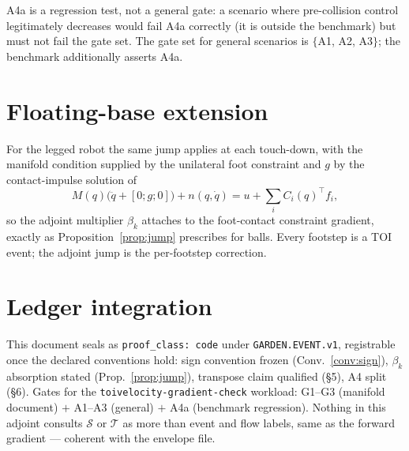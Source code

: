 \documentclass[11pt]{article}
\begin{document}
A4a is a regression test, not a general gate: a scenario where
pre-collision control legitimately decreases would fail A4a
correctly (it is outside the benchmark) but must not fail the
gate set. The gate set for general scenarios is
$\{$A1, A2, A3$\}$; the benchmark additionally asserts A4a.

\section{Floating-base extension}
For the legged robot the same jump applies at each touch-down,
with the manifold condition supplied by the unilateral foot
constraint and $g$ by the contact-impulse solution of
\begin{equation}
  M(q)\bigl(\ddot q + [0;g;0]\bigr) + n(q,\dot q)
  = u + \sum_i C_i(q)^\top f_i ,
\end{equation}
so the adjoint multiplier $\beta_k$ attaches to the foot-contact
constraint gradient, exactly as Proposition~\ref{prop:jump}
prescribes for balls. Every footstep is a TOI event; the adjoint
jump is the per-footstep correction.

\section{Ledger integration}
This document seals as \texttt{proof\_class: code} under
\texttt{GARDEN.EVENT.v1}, registrable once the declared conventions
hold: sign convention frozen (Conv.~\ref{conv:sign}), $\beta_k$
absorption stated (Prop.~\ref{prop:jump}), transpose claim
qualified (§5), A4 split (§6). Gates for the
\texttt{toivelocity-gradient-check} workload:
G1--G3 (manifold document) $+$ A1--A3 (general) $+$ A4a
(benchmark regression). Nothing in this adjoint consults
$\mathcal{S}$ or $\mathcal{T}$ as more than event and flow labels,
same as the forward gradient — coherent with the envelope file.
\end{document}
